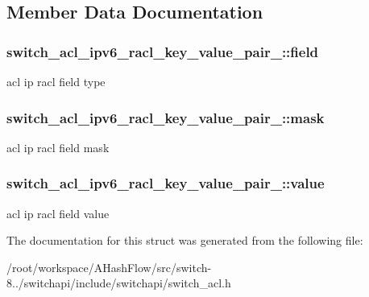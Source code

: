 \subsection{Member Data Documentation}
\hypertarget{structswitch__acl__ipv6__racl__key__value__pair___a4ed040e3b762954808f88cb8b00ae484}{
\subsubsection[{field}]{ switch\+\_\+acl\+\_\+ipv6\+\_\+racl\+\_\+key\+\_\+value\+\_\+pair\+\_\+\+::field}}\label{structswitch__acl__ipv6__racl__key__value__pair___a4ed040e3b762954808f88cb8b00ae484}
acl ip racl field type \hypertarget{structswitch__acl__ipv6__racl__key__value__pair___a3afff80a90086593bc17d4cba8111ee0}{
\subsubsection[{mask}]{ switch\+\_\+acl\+\_\+ipv6\+\_\+racl\+\_\+key\+\_\+value\+\_\+pair\+\_\+\+::mask}}\label{structswitch__acl__ipv6__racl__key__value__pair___a3afff80a90086593bc17d4cba8111ee0}
acl ip racl field mask \hypertarget{structswitch__acl__ipv6__racl__key__value__pair___ab5645885e388c844892473c21116f261}{
\subsubsection[{value}]{ switch\+\_\+acl\+\_\+ipv6\+\_\+racl\+\_\+key\+\_\+value\+\_\+pair\+\_\+\+::value}}\label{structswitch__acl__ipv6__racl__key__value__pair___ab5645885e388c844892473c21116f261}
acl ip racl field value 

The documentation for this struct was generated from the following file\+:\begin{DoxyCompactItemize}
\item 
/root/workspace/\+A\+Hash\+Flow/src/switch-\/8../switchapi/include/switchapi/switch\+\_\+acl.\+h\end{DoxyCompactItemize}

